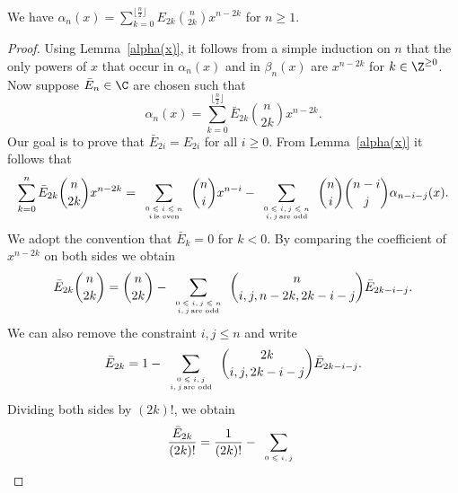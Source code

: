 \documentclass[11pt]{amsart}
\begin{document}
\begin{prp}
\label{prp:alphaa}
We have $\alpha_{n}(x)=\sum_{k=0}^{\lfloor \frac n2\rfloor } E_{2k}{n \choose 2k}x^{n-2k}$ for $n\geq 1$.
\end{prp}
\begin{proof}
Using Lemma~\ref{alpha(x)}, it follows  from a simple induction on $n$ that the only powers of $x$ that occur in $\alpha_n(x)$ and in $\beta_n(x)$ are $x^{n-2k}$ for $k\in\Z^{\geq 0}$. Now suppose $\bar E_n\in\C$ are chosen such that 
\[
\alpha_{n}(x)=\sum_{k=0}^{\lfloor \frac n2 \rfloor} \bar{E}_{2k}{n \choose 2k}x^{n-2k}.
\]
Our goal is to prove that $\bar{E}_{2i}=E_{2i}$ for all $i\geq 0$.
From Lemma~\ref{alpha(x)} it follows that 
\begin{align*}
\sum_{k=0}^n \bar{E}_{2k}{n \choose 2k}x^{n-2k}=\sum_{\tiny
\begin{array}{cc}
0\leqslant i\leqslant n\\
i \, \text{is even}
\end{array}} {n \choose i}x^{n-i}-\sum_{\tiny
\begin{array}{cc}
0\leqslant i,j\leqslant n\\
i,j \, \text{are odd}
\end{array}} {n \choose i} {n-i \choose j}\alpha_{n-i-j}(x).
\end{align*}
We adopt the convention that \({\bar E}_k = 0\) for \(k < 0\). 
By comparing the coefficient of $x^{n-2k}$ on both sides we obtain
\begin{align*}
\bar{E}_{2k}{n \choose 2k}={n \choose 2k}-\sum_{\tiny
\begin{array}{cc}
0\leqslant i,j\leqslant n\\
i,j \, \text{are odd}
\end{array}} {n \choose i,j,n-2k,2k-i-j}\bar{E}_{2k-i-j}.
\end{align*}
We can also remove the constraint $i,j \leqslant n$ and write
\begin{align*}
\bar{E}_{2k}=1-\sum_{\tiny
\begin{array}{cc}
0\leqslant i,j\\
i,j \, \text{are odd}
\end{array}} {2k \choose i,j,2k-i-j}\bar{E}_{2k-i-j}.
\end{align*}
 Dividing both sides by $(2k)!$, we obtain
\begin{align*}
\frac{\bar{E}_{2k}}{(2k)!}=\frac{1}{(2k)!}-\sum_{\tiny
\begin{array}{cc}
0\leqslant i,j \\

\end{array}}
\end{align*}
\end{proof}
\end{document}
